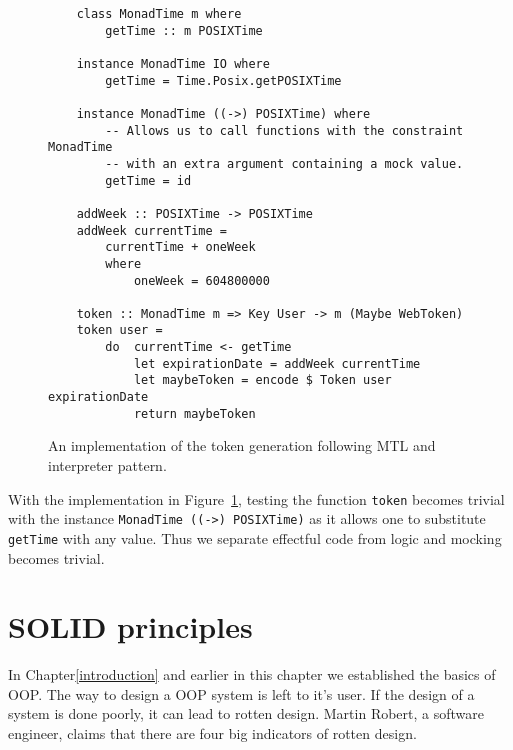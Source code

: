 \begin{figure}[H]
    \begin{lstlisting}
    class MonadTime m where
        getTime :: m POSIXTime

    instance MonadTime IO where
        getTime = Time.Posix.getPOSIXTime

    instance MonadTime ((->) POSIXTime) where
        -- Allows us to call functions with the constraint MonadTime
        -- with an extra argument containing a mock value.
        getTime = id

    addWeek :: POSIXTime -> POSIXTime
    addWeek currentTime =
        currentTime + oneWeek
        where
            oneWeek = 604800000

    token :: MonadTime m => Key User -> m (Maybe WebToken)
    token user =
        do  currentTime <- getTime
            let expirationDate = addWeek currentTime
            let maybeToken = encode $ Token user expirationDate
            return maybeToken
    \end{lstlisting}
    \caption{An implementation of the token generation following MTL and
    interpreter pattern.}
    \label{tokencorrect}
\end{figure}

With the implementation in Figure~\ref{tokencorrect}, testing the function
\texttt{token} becomes trivial with the instance \texttt{MonadTime ((->)
POSIXTime)} as it allows one to substitute \texttt{getTime} with any value. Thus
we separate effectful code from logic and mocking becomes trivial.


\section{SOLID principles}\label{oop}


In Chapter\ref{introduction} and earlier in this chapter we established the
basics of OOP. The way to design a OOP system is left to it's user. If the
design of a system is done poorly, it can lead to rotten design. Martin Robert,
a software engineer, claims that there are four big indicators of rotten design.


